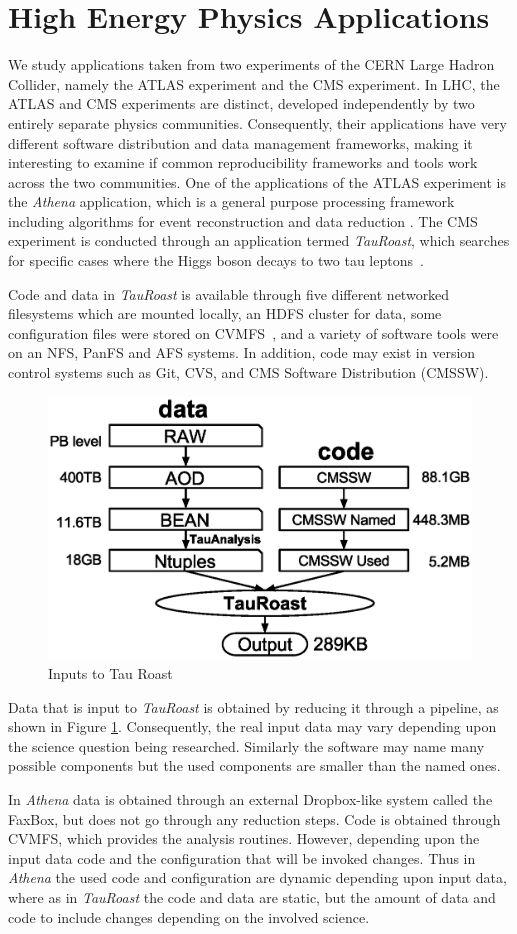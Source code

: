 \section{High Energy Physics Applications}

We study applications taken from two experiments of the CERN Large Hadron Collider, namely the ATLAS experiment and the CMS experiment. 
In LHC, the ATLAS and CMS experiments are distinct, 
developed independently by two entirely separate physics communities. Consequently, their applications  
have very different software distribution and data management frameworks, making it interesting to examine if common reproducibility frameworks and 
tools work across the two communities. 
One of the applications of the ATLAS experiment is the \emph{Athena} application, which is a general purpose processing framework including algorithms
for event reconstruction and data reduction \cite{calafiura2005athena}. The CMS experiment is conducted through an application termed  \emph{TauRoast}, which searches for specific 
cases where the Higgs boson decays to two tau leptons~\cite{chatrchyan2013search}. 

Code and data in \emph{TauRoast} is available through five different networked filesystems which are mounted locally, an HDFS cluster for data, 
some configuration files were stored on CVMFS~\cite{blomer2011cernvm}, and a variety of software tools were on an NFS, PanFS and AFS systems.
In addition, code may exist in version control systems such as Git, CVS, and CMS Software Distribution (CMSSW). %
\begin{figure}
\small
\centering
\includegraphics[width=.4\textwidth]{data-code-size.eps}
\caption{Inputs to Tau Roast}
\label{fig:data-code-size}
\end{figure}
Data that is input to \emph{TauRoast} is obtained by reducing it through a pipeline, as shown in Figure \ref{fig:data-code-size}. Consequently, the real input data may 
vary depending upon the science question being researched. Similarly the software may name many possible components but the used components are
smaller than the named ones. 

In \emph{Athena} data is obtained through an external Dropbox-like system called the FaxBox, but does not go through any reduction steps. Code is obtained through 
CVMFS, which provides the analysis routines. However, depending upon the input data code and the configuration that will be invoked changes. 
Thus in \emph{Athena} the used code and configuration are dynamic depending upon input data, where as in \emph{TauRoast} the code and data are static, 
but the amount of data and code to include changes depending on the involved science. 

